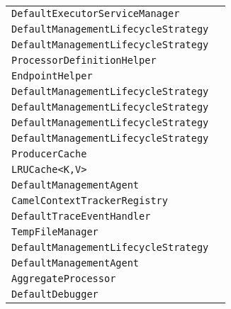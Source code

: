 \begin{center}
\begin{tabular}{ll}
\lstinline/DefaultExecutorServiceManager/&\raisebox{0pt}{\lstinline/doShutdown()/}\\
\lstinline/DefaultManagementLifecycleStrategy/&\raisebox{0pt}{\lstinline/onRoutesAdd(Collection<Route>)/}\\
\lstinline/DefaultManagementLifecycleStrategy/&\raisebox{0pt}{\lstinline/onRoutesAdd(Collection<Route>)/}\\
\lstinline/ProcessorDefinitionHelper/&\raisebox{0pt}{\lstinline/run()/}\\
\lstinline/EndpointHelper/&\raisebox{0pt}{\lstinline/pollEndpoint(long)/}\\
\lstinline/DefaultManagementLifecycleStrategy/&\raisebox{0pt}{\lstinline/onErrorHandlerRemove(RouteContext,Processo,ErrorHandlerFactory)/}\\
\lstinline/DefaultManagementLifecycleStrategy/&\raisebox{0pt}{\lstinline/onErrorHandlerAdd(RouteContext,Processo,ErrorHandlerFactory)/}\\
\lstinline/DefaultManagementLifecycleStrategy/&\raisebox{0pt}{\lstinline/onServiceAdd(CamelContext,Service,Route)/}\\
\lstinline/DefaultManagementLifecycleStrategy/&\raisebox{0pt}{\lstinline/onServiceRemove(CamelContext,Service,Route)/}\\
\lstinline/ProducerCache/&\raisebox{0pt}{\lstinline/doInProducer(Endpoint,Exchange,ExchangePattern,ProducerCallback)/}\\
\lstinline/LRUCache<K,V>/&\raisebox{0pt}{\lstinline/onRemoval(Kkey,Vvalue,RemovalCausecause)/}\\
\lstinline/DefaultManagementAgent/&\raisebox{0pt}{\lstinline/doStop()/}\\
\lstinline/CamelContextTrackerRegistry/&\raisebox{0pt}{\lstinline/contextCreated(CamelContext)/}\\
\lstinline/DefaultTraceEventHandler/&\raisebox{0pt}{\lstinline/traceExchange(ProcessorDefinition,Processor,TraceInterceptor,Exchange)/}\\
\lstinline/TempFileManager/&\raisebox{0pt}{\lstinline/onDone(Exchange)/}\\
\lstinline/DefaultManagementLifecycleStrategy/&\raisebox{0pt}{\lstinline/onThreadPoolAdd(CamelContext)/}\\
\lstinline/DefaultManagementAgent/&\raisebox{0pt}{\lstinline/createMBeanServer()/}\\
\lstinline/AggregateProcessor/&\raisebox{0pt}{\lstinline/doForceCompletionOnStop()/}\\
\lstinline/DefaultDebugger/&\raisebox{0pt}{\lstinline/onBeforeProcess(Exchange,Processor,ProcessorDefinition,Breakpoint)/}\\

\end{tabular}
\end{center}
